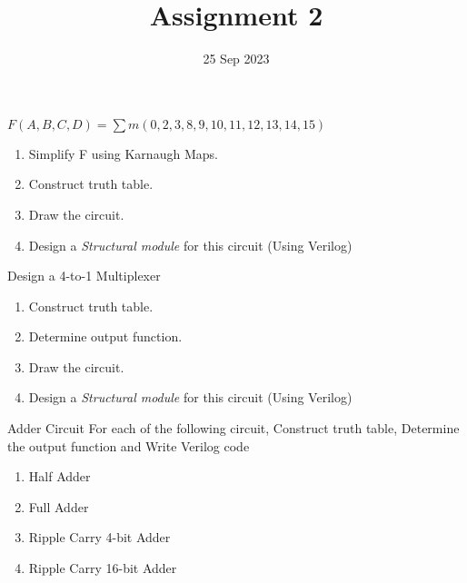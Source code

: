 \documentclass{vhdl-assignment}
\title{Assignment 2}
\date{25 Sep 2023}
\begin{document}
\maketitle

\begin{problem}{}
    $F(A,B,C,D)=\sum m(0,2,3,8,9,10,11,12,13,14,15)$
    \begin{enumerate}
        \item Simplify F using Karnaugh Maps.
        \item Construct truth table.
        \item Draw the circuit.
        \item Design a \emph{Structural module} for this circuit (Using Verilog)
    \end{enumerate}
\end{problem}

\begin{problem}{Design a 4-to-1 Multiplexer}
    \begin{enumerate}
        \item Construct truth table.
        \item Determine output function.
        \item Draw the circuit.
        \item Design a \emph{Structural module} for this circuit (Using Verilog)
    \end{enumerate}
\end{problem}

\begin{problem}{Adder Circuit}
    For each of the following circuit, Construct truth table, Determine the output function and Write Verilog code 
    \begin{enumerate}
        \item Half Adder
        \item Full Adder
        \item Ripple Carry 4-bit Adder
        \item Ripple Carry 16-bit Adder
    \end{enumerate}
\end{problem}
\end{document}
